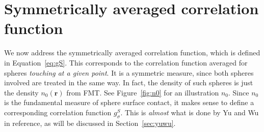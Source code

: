 \documentclass[letterpaper,twocolumn,amsmath,amssymb,jcp,10pt,aip]{revtex4-1}
\newcommand{\rr}{\textbf{r}}
\begin{document}
\section{Symmetrically averaged correlation function}\label{sec:g-S}

We now address the symmetrically averaged correlation function, which
is defined in Equation~\ref{eq:gS}.  This corresponds to the
correlation function averaged for
spheres \emph{touching at a given point}.  It is a symmetric
measure, since both spheres involved are treated in the same way.  In
fact, the density of such spheres is just the density $n_0(\rr)$ from
FMT.  See Figure~\ref{fig:n0} for an illustration $n_0$.  Since $n_0$
is the fundamental measure of sphere surface contact, it makes sense
to define a corresponding correlation function $g_\sigma^S$.  This is
\emph{almost} what is done by Yu and  Wu in
reference\cite{yu2002fmt-dft-inhomogeneous-associating}, as will be
discussed in Section~\ref{sec:yuwu}.
\end{document}
